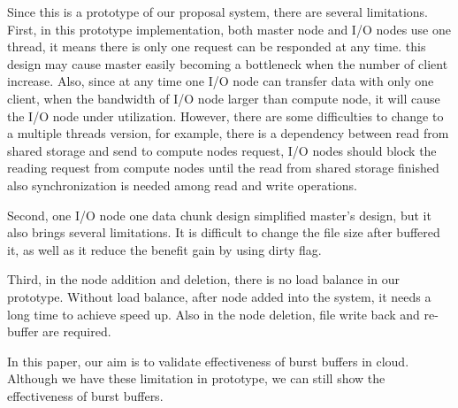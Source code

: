 Since this is a prototype of our proposal system, there are several limitations.
First, in this prototype implementation, both master node and I/O nodes use one thread, it means
there is only one request can be responded at any time.
this design may cause master easily becoming a bottleneck when the number of client increase.
Also, since at any time one I/O node can transfer data with only one client, when the bandwidth of
I/O node larger than compute node, it will cause the I/O node under utilization.
However, there are some difficulties to change to a multiple threads version, for example, there
is a dependency between read from shared storage and send to compute nodes request, I/O nodes should
block the reading request from compute nodes until the read from shared storage finished also
synchronization is needed among read and write operations.

Second, one I/O node one data chunk design simplified master's design, but it also brings several
limitations. It is difficult to change the file size after buffered it, as well as it reduce the
benefit gain by using dirty flag.

Third, in the node addition and deletion, there is no load balance in our prototype.
Without load balance, after node added into the system, it needs a long time to achieve speed up.
Also in the node deletion, file write back and re-buffer are required.

In this paper, our aim is to validate effectiveness of burst buffers in
cloud.
Although we have these limitation in prototype, we can still show the effectiveness of burst
buffers.

